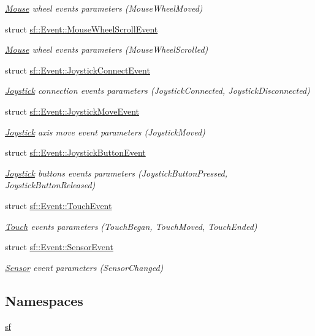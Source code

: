 \begin{DoxyCompactItemize}
\begin{DoxyCompactList}\small\item\em \hyperlink{classsf_1_1_mouse}{Mouse} wheel events parameters (Mouse\-Wheel\-Moved) \end{DoxyCompactList}\item 
struct \hyperlink{structsf_1_1_event_1_1_mouse_wheel_scroll_event}{sf\-::\-Event\-::\-Mouse\-Wheel\-Scroll\-Event}
\begin{DoxyCompactList}\small\item\em \hyperlink{classsf_1_1_mouse}{Mouse} wheel events parameters (Mouse\-Wheel\-Scrolled) \end{DoxyCompactList}\item 
struct \hyperlink{structsf_1_1_event_1_1_joystick_connect_event}{sf\-::\-Event\-::\-Joystick\-Connect\-Event}
\begin{DoxyCompactList}\small\item\em \hyperlink{classsf_1_1_joystick}{Joystick} connection events parameters (Joystick\-Connected, Joystick\-Disconnected) \end{DoxyCompactList}\item 
struct \hyperlink{structsf_1_1_event_1_1_joystick_move_event}{sf\-::\-Event\-::\-Joystick\-Move\-Event}
\begin{DoxyCompactList}\small\item\em \hyperlink{classsf_1_1_joystick}{Joystick} axis move event parameters (Joystick\-Moved) \end{DoxyCompactList}\item 
struct \hyperlink{structsf_1_1_event_1_1_joystick_button_event}{sf\-::\-Event\-::\-Joystick\-Button\-Event}
\begin{DoxyCompactList}\small\item\em \hyperlink{classsf_1_1_joystick}{Joystick} buttons events parameters (Joystick\-Button\-Pressed, Joystick\-Button\-Released) \end{DoxyCompactList}\item 
struct \hyperlink{structsf_1_1_event_1_1_touch_event}{sf\-::\-Event\-::\-Touch\-Event}
\begin{DoxyCompactList}\small\item\em \hyperlink{classsf_1_1_touch}{Touch} events parameters (Touch\-Began, Touch\-Moved, Touch\-Ended) \end{DoxyCompactList}\item 
struct \hyperlink{structsf_1_1_event_1_1_sensor_event}{sf\-::\-Event\-::\-Sensor\-Event}
\begin{DoxyCompactList}\small\item\em \hyperlink{classsf_1_1_sensor}{Sensor} event parameters (Sensor\-Changed) \end{DoxyCompactList}\end{DoxyCompactItemize}
\subsection*{Namespaces}
\begin{DoxyCompactItemize}
\item 
\hyperlink{namespacesf}{sf}
\end{DoxyCompactItemize}

